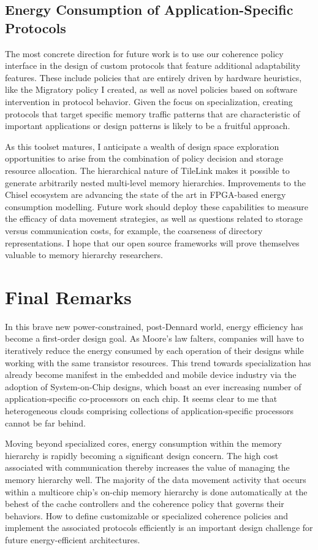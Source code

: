\subsection{Energy Consumption of Application-Specific Protocols}

The most concrete direction for future work is to use our coherence policy interface
in the design of custom protocols that feature additional adaptability features.
These include policies that are entirely driven by hardware heuristics, like the Migratory policy
I created, as well as novel policies based on software intervention in protocol behavior.
Given the focus on specialization, creating protocols that target specific memory traffic patterns that are
characteristic of important applications or design patterns is likely to be a fruitful approach.

As this toolset matures, I anticipate a wealth of design space exploration opportunities to arise
from the combination of policy decision and storage resource allocation.
The hierarchical nature of TileLink makes it possible to generate arbitrarily nested multi-level memory hierarchies.
Improvements to the Chisel ecosystem are advancing the state of the art in FPGA-based energy consumption modelling.
Future work should deploy these capabilities to measure the efficacy of data movement strategies,
as well as questions related to storage versus communication costs, for example, the coarseness of directory representations.
I hope that our open source frameworks will prove themselves valuable to memory hierarchy researchers.

\section{Final Remarks}

In this brave new power-constrained, post-Dennard world, energy efficiency has become a first-order design goal.
As Moore's law falters, companies will have to iteratively reduce the energy consumed by each operation of their designs
while working with the same transistor resources.
This trend towards specialization has already become manifest in the embedded and mobile device industry via the adoption of
System-on-Chip designs, which boast an ever increasing number of application-specific co-processors on each chip.
It seems clear to me that heterogeneous clouds comprising collections of application-specific processors cannot be far behind.

Moving beyond specialized cores, energy consumption within the memory hierarchy is rapidly becoming a significant design concern.
The high cost associated with communication thereby increases the value of managing the memory hierarchy well.
The majority of the data movement activity that occurs within a multicore chip's on-chip memory hierarchy is done automatically at the behest of the cache controllers and the coherence policy that governs their behaviors.
How to define customizable or specialized coherence policies and
implement the associated protocols efficiently is an important design challenge for future energy-efficient architectures. 

